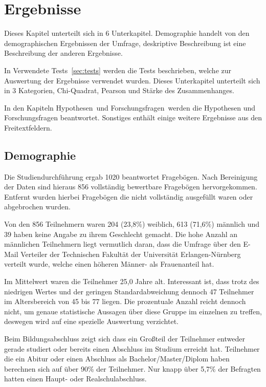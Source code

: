 %
% 

\chapter{Ergebnisse}

Dieses Kapitel unterteilt sich in 6 Unterkapitel. Demographie handelt von den demographischen Ergebnissen der Umfrage, deskriptive Beschreibung ist eine Beschreibung der anderen Ergebnisse.

In \glqq Verwendete Tests\grqq\ \ref{sec:tests} werden die Tests beschrieben, welche zur Auswertung der Ergebnisse verwendet wurden. Dieses Unterkapitel unterteilt sich in 3 Kategorien, Chi-Quadrat, Pearson und Stärke des Zusammenhanges.

In den Kapiteln \glqq Hypothesen\grqq\ und \glqq Forschungsfragen\grqq\ werden die Hypothesen und Forschungsfragen beantwortet. Sonstiges enthält einige weitere Ergebnisse aus den Freitextfeldern.


\section{Demographie}
\label{sec:demo}
Die Studiendurchführung ergab 1020 beantwortet Fragebögen. Nach Bereinigung der Daten sind hieraus 856 vollständig bewertbare Fragebögen hervorgekommen. Entfernt wurden hierbei Fragebögen die nicht vollständig ausgefüllt waren oder abgebrochen wurden.

Von den 856 Teilnehmern waren 204 (23,8\%) weiblich, 613 (71,6\%) männlich und 39 haben keine Angabe zu ihrem Geschlecht gemacht. Die hohe Anzahl an männlichen Teilnehmern liegt vermutlich daran, dass die Umfrage über den E-Mail Verteiler der Technischen Fakultät der Universität Erlangen-Nürnberg verteilt wurde, welche einen höheren Männer- als Frauenanteil hat.

Im Mittelwert waren die Teilnehmer 25,0 Jahre alt. Interessant ist, dass trotz des niedrigen Wertes und der geringen Standardabweichung dennoch 47 Teilnehmer im Altersbereich von 45 bis 77 liegen. Die prozentuale Anzahl reicht dennoch nicht, um genaue statistische Aussagen über diese Gruppe im einzelnen zu treffen, deswegen wird auf eine spezielle Auswertung verzichtet.

Beim Bildungsabschluss zeigt sich dass ein Großteil der Teilnehmer entweder gerade studiert oder bereits einen Abschluss im Studium erreicht hat. Teilnehmer die ein Abitur oder einen Abschluss als Bachelor/Master/Diplom haben berechnen sich auf über 90\% der Teilnehmer. Nur knapp über 5,7\% der Befragten hatten einen Haupt- oder Realschulabschluss.


